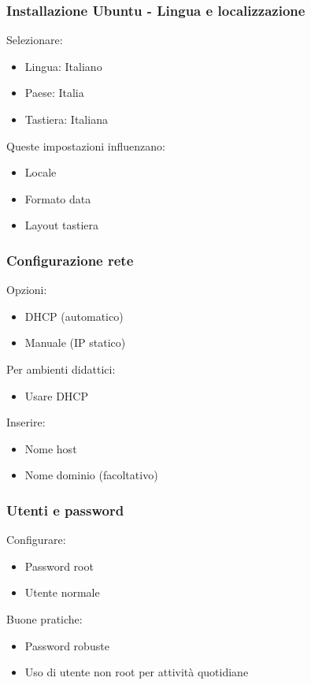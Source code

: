 \documentclass{beamer}
\begin{document}
	
	
	
	\begin{frame}
		\frametitle{Installazione Ubuntu - Lingua e localizzazione}
		
		Selezionare:
		\begin{itemize}
			\item Lingua: Italiano
			\item Paese: Italia
			\item Tastiera: Italiana
		\end{itemize}
		
		Queste impostazioni influenzano:
		\begin{itemize}
			\item Locale
			\item Formato data
			\item Layout tastiera
		\end{itemize}
		
	\end{frame}
	
	
	\begin{frame}
		\frametitle{Configurazione rete}
		
		Opzioni:
		\begin{itemize}
			\item DHCP (automatico)
			\item Manuale (IP statico)
		\end{itemize}
		
		Per ambienti didattici:
		\begin{itemize}
			\item Usare DHCP
		\end{itemize}
		
		Inserire:
		\begin{itemize}
			\item Nome host
			\item Nome dominio (facoltativo)
		\end{itemize}
		
	\end{frame}
	
	
	\begin{frame}
		\frametitle{Utenti e password}
		
		Configurare:
		
		\begin{itemize}
			\item Password root
			\item Utente normale
		\end{itemize}
		
		Buone pratiche:
		\begin{itemize}
			\item Password robuste
			\item Uso di utente non root per attività quotidiane
		\end{itemize}
		
	\end{frame}
	
\end{document}

